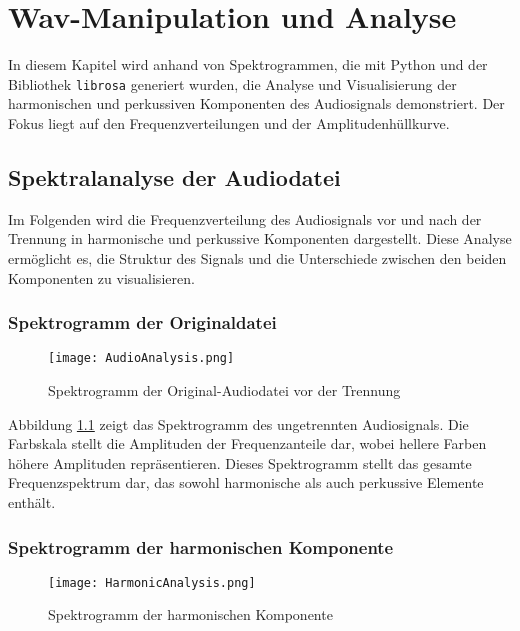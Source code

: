 \chapter{Wav-Manipulation und Analyse}

In diesem Kapitel wird anhand von Spektrogrammen, die mit Python und der Bibliothek \texttt{librosa} generiert wurden, die Analyse und Visualisierung der harmonischen und perkussiven Komponenten des Audiosignals demonstriert. Der Fokus liegt auf den Frequenzverteilungen und der Amplitudenhüllkurve.

\section{Spektralanalyse der Audiodatei}

Im Folgenden wird die Frequenzverteilung des Audiosignals vor und nach der Trennung in harmonische und perkussive Komponenten dargestellt. Diese Analyse ermöglicht es, die Struktur des Signals und die Unterschiede zwischen den beiden Komponenten zu visualisieren.	

\subsection{Spektrogramm der Originaldatei}

\begin{figure}[H]
    \centering
    \texttt{[image: AudioAnalysis.png]}
    \caption{Spektrogramm der Original-Audiodatei vor der Trennung}
    \label{fig:audio_analysis}
\end{figure}

Abbildung \ref{fig:audio_analysis} zeigt das Spektrogramm des ungetrennten Audiosignals. Die Farbskala stellt die Amplituden der Frequenzanteile dar, wobei hellere Farben höhere Amplituden repräsentieren. Dieses Spektrogramm stellt das gesamte Frequenzspektrum dar, das sowohl harmonische als auch perkussive Elemente enthält.

\subsection{Spektrogramm der harmonischen Komponente}

\begin{figure}[H]
    \centering
    \texttt{[image: HarmonicAnalysis.png]}
    \caption{Spektrogramm der harmonischen Komponente}
    \label{fig:harmonic_analysis}
\end{figure}

